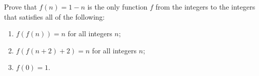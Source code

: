 Prove that $f(n)=1-n$ is the only function $f$ from the integers to the integers that satisfies all of the following:
\begin{enumerate}
\item[(i)] $f(f(n))=n$ for all integers $n$;
\item[(ii)] $f(f(n+2)+2)=n$ for all integers $n$;
\item[(iii)] $f(0)=1$.
\end{enumerate}
